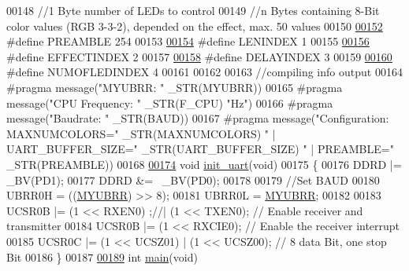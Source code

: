 \begin{DoxyCode}
{00148 \textcolor{comment}{//1 Byte number of LEDs to control}
00149 \textcolor{comment}{//n Bytes containing 8-Bit color values (RGB 3-3-2), depended on the effect, max. 50 values}
00150 
\hypertarget{ws2811lichterkette_8c_source_l00152}{}\hyperlink{ws2811lichterkette_8c_a8aac8c5098aaf915463fb31715efa09f}{00152} \textcolor{preprocessor}{#define PREAMBLE 254        }
00153 
\hypertarget{ws2811lichterkette_8c_source_l00154}{}\hyperlink{ws2811lichterkette_8c_aec9ae4a8d59e838ac8ed93ad0de8e827}{00154} \textcolor{preprocessor}{#define LENINDEX 1          }
00155 
\hypertarget{ws2811lichterkette_8c_source_l00156}{}\hyperlink{ws2811lichterkette_8c_a8d4e4cf47dd6136ace963623e1a8e27c}{00156} \textcolor{preprocessor}{#define EFFECTINDEX 2       }
00157 
\hypertarget{ws2811lichterkette_8c_source_l00158}{}\hyperlink{ws2811lichterkette_8c_a9ff437877d0878dd16eacf103a1e1c40}{00158} \textcolor{preprocessor}{#define DELAYINDEX 3        }
00159 
\hypertarget{ws2811lichterkette_8c_source_l00160}{}\hyperlink{ws2811lichterkette_8c_afbc75dc20761a05dda7cbb70b9b322dd}{00160} \textcolor{preprocessor}{#define NUMOFLEDINDEX 4     }
00161 
00162 
00163 \textcolor{comment}{//compiling info output}
00164 \textcolor{preprocessor}{#pragma message("MYUBRR: " \_STR(MYUBRR))}
00165 \textcolor{preprocessor}{#pragma message("CPU Frequency: " \_STR(F\_CPU) "Hz")}
00166 \textcolor{preprocessor}{#pragma message("Baudrate: " \_STR(BAUD))}
00167 \textcolor{preprocessor}{#pragma message("Configuration: MAXNUMCOLORS=" \_STR(MAXNUMCOLORS)  " | UART\_BUFFER\_SIZE="
       \_STR(UART\_BUFFER\_SIZE) " | PREAMBLE=" \_STR(PREAMBLE))}
00168 
\hypertarget{ws2811lichterkette_8c_source_l00174}{}\hyperlink{ws2811lichterkette_8c_ac7b3df0fa68526d64c732d5f916e34b1}{00174} \textcolor{keywordtype}{void} \hyperlink{ws2811lichterkette_8c_ac7b3df0fa68526d64c732d5f916e34b1}{init\_uart}(\textcolor{keywordtype}{void})
00175 \{
00176     DDRD |= \_BV(PD1);
00177     DDRD &= ~\_BV(PD0);
00178     
00179      \textcolor{comment}{//Set BAUD}
00180      UBRR0H = ((\hyperlink{ws2811lichterkette_8c_a711e9130c825a7269c8c87dbb57a85e0}{MYUBRR}) >> 8);
00181      UBRR0L = \hyperlink{ws2811lichterkette_8c_a711e9130c825a7269c8c87dbb57a85e0}{MYUBRR};
00182      
00183      UCSR0B |= (1 << RXEN0) ;\textcolor{comment}{//| (1 << TXEN0);     // Enable receiver and transmitter}
00184      UCSR0B |= (1 << RXCIE0);                   \textcolor{comment}{// Enable the receiver interrupt}
00185      UCSR0C |= (1 << UCSZ01) | (1 << UCSZ00);   \textcolor{comment}{// 8 data Bit, one stop Bit}
00186 \}
00187 
\hypertarget{ws2811lichterkette_8c_source_l00189}{}\hyperlink{ws2811lichterkette_8c_a840291bc02cba5474a4cb46a9b9566fe}{00189} \textcolor{keywordtype}{int} \hyperlink{ws2811lichterkette_8c_a840291bc02cba5474a4cb46a9b9566fe}{main}(\textcolor{keywordtype}{void})
}
\end{DoxyCode}
